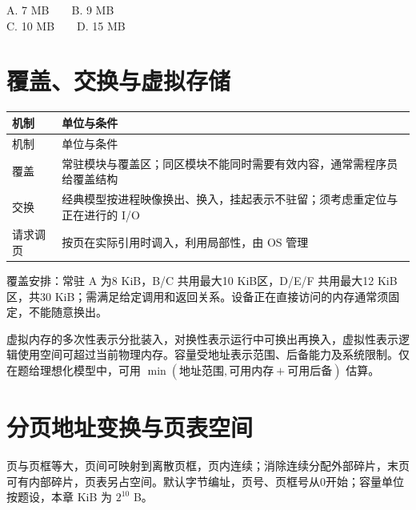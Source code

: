 A. 7 MB　　B. 9 MB\\
C. 10 MB　　D. 15 MB

\section{覆盖、交换与虚拟存储}\label{OS03-extension}

\par\smallskip
{\fontsize{9.3}{12}\selectfont\setlength{\tabcolsep}{2.5pt}\setlength{\LTleft}{0pt}\setlength{\LTright}{0pt}
\begin{longtable}{@{}>{\raggedright\arraybackslash}p{}>{\raggedright\arraybackslash}p{}@{}}
\toprule
机制 & 单位与条件 \\

\midrule\endfirsthead\toprule
机制 & 单位与条件 \\

\midrule\endhead\bottomrule\endfoot
覆盖 & 常驻模块与覆盖区；同区模块不能同时需要有效内容，通常需程序员给覆盖结构 \\

交换 & 经典模型按进程映像换出、换入，挂起表示不驻留；须考虑重定位与正在进行的 I/O \\

请求调页 & 按页在实际引用时调入，利用局部性，由 OS 管理 \\

\end{longtable}}
\par\smallskip

覆盖安排：常驻 A 为8 KiB，B/C 共用最大10 KiB区，D/E/F 共用最大12 KiB区，共30 KiB；需满足给定调用和返回关系。设备正在直接访问的内存通常须固定，不能随意换出。

虚拟内存的多次性表示分批装入，对换性表示运行中可换出再换入，虚拟性表示逻辑使用空间可超过当前物理内存。容量受地址表示范围、后备能力及系统限制。仅在题给理想化模型中，可用 \(\min(\text{地址范围},\text{可用内存}+\text{可用后备})\) 估算。

\section{分页地址变换与页表空间}\label{OS03-paging}

页与页框等大，页间可映射到离散页框，页内连续；消除连续分配外部碎片，末页可有内部碎片，页表另占空间。默认字节编址，页号、页框号从0开始；容量单位按题设，本章 KiB 为 \(2^{10}\) B。

